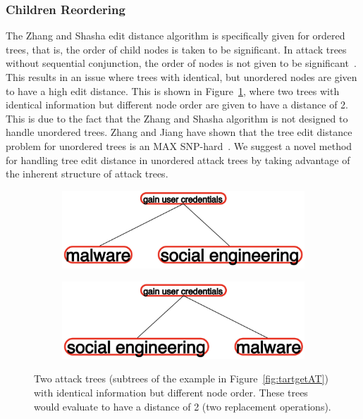 \subsubsection{Children Reordering}
The Zhang and Shasha edit distance algorithm is specifically given for ordered trees, that is, the order of child nodes is taken to be significant. In attack trees without sequential conjunction, the order of nodes is not given to be significant~\cite{mauw_foundations_2006,jhawar_attack_2015}. This results in an issue where trees with identical, but unordered nodes are given to have a high edit distance. This is shown in Figure~\ref{fig:nodeflipping}, where two trees with identical information but different node order are given to have a distance of 2. This is due to the fact that the Zhang and Shasha algorithm is not designed to handle unordered trees. Zhang and Jiang have shown that the tree edit distance problem for unordered trees is an MAX SNP-hard~\cite{zhangMAXSNPhardResults1994}. We suggest a novel method for handling tree edit distance in unordered attack trees by taking advantage of the inherent structure of attack trees.


\begin{figure}
    \begin{subfigure}{.45\linewidth}
        \includegraphics[width=\linewidth]{img/NodeFlip1.png}
    \end{subfigure}
    \begin{subfigure}{.45\linewidth}
        \includegraphics[width=\linewidth]{img/NodeFlip2.png}
    \end{subfigure}
    \caption{Two attack trees (subtrees of the example in Figure~\ref{fig:tartgetAT}) with identical information but different node order. These trees would evaluate to have a distance of 2 (two replacement operations).}
    \label{fig:nodeflipping}
\end{figure}

